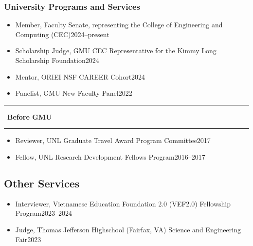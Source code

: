 \documentclass[11pt]{article}
\newcommand{\beforegmu}{\begin{center}\rule{2in}{0.8pt}~\textbf{Before GMU}~\rule{2in}{0.8pt}\end{center}}
\begin{document}
\myunitservices{}


\subsubsection{University Programs and Services}
\begin{itemize}
    \item Member, Faculty Senate, representing the College of Engineering and Computing (CEC)\hfill 2024--present    
    \item Scholarship Judge, GMU CEC Representative for the Kimmy Long Scholarship Foundation\hfill 2024
    \item Mentor, ORIEI NSF CAREER Cohort\hfill 2024
    \item Panelist, GMU New Faculty Panel\hfill 2022
\end{itemize}
\vspace{0.1in}
\beforegmu{}
\vspace{0.1in}
\begin{itemize}
    \item Reviewer,  UNL Graduate Travel Award Program Committee\hfill 2017
    \item Fellow, UNL Research Development Fellows Program\hfill 2016--2017
\end{itemize}


\subsection{Other Services}
\begin{itemize}
    \item  Interviewer, Vietnamese Education Foundation 2.0 (VEF2.0) Fellowship Program\hfill 2023--2024
    \item Judge, Thomas Jefferson Highschool (Fairfax, VA) Science and Engineering Fair\hfill 2023
\end{itemize}
\end{document}
